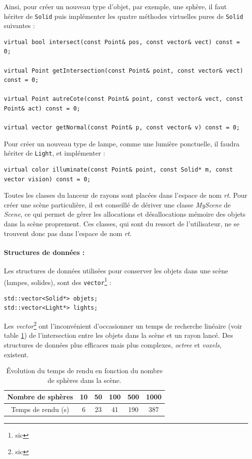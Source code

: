 Ainsi, pour créer un nouveau type d'objet, par exemple, une sphère, il faut hériter de \verb|Solid| puis implémenter les quatre méthodes virtuelles 
pures de \verb|Solid| suivantes :

\begin{lstlisting}
virtual bool intersect(const Point& pos, const vector& vect) const = 0;

virtual Point getIntersection(const Point& point, const vector& vect) const = 0;

virtual Point autreCote(const Point& point, const vector& vect,	const Point& act) const = 0;

virtual vector getNormal(const Point& p, const vector& v) const = 0;
\end{lstlisting}

Pour créer un nouveau type de lampe, comme une lumière ponctuelle, il faudra hériter de \verb|Light|, et implémenter :
\begin{lstlisting}
virtual color illuminate(const Point& point, const Solid* m, const vector vision) const = 0;
\end{lstlisting}

Toutes les classes du lanceur de rayons sont placées dans l'espace de nom \emph{rt}. Pour créer une scène particulière, il est
conseillé de dériver une classe \emph{MyScene}  de \emph{Scene}, ce qui permet de gérer les allocations et désallocations 
mémoire des objets dans la scène proprement. Ces classes, qui sont du ressort de l'utilisateur, ne se trouvent donc pas dans l'espace
 de nom \emph{rt}.

\paragraph{Structures de données : }
Les structures de données utilisées pour conserver les objets dans une scène (lampes, solides), sont des \verb|vector|\footnote{sic} : 
\begin{lstlisting}
std::vector<Solid*> objets;
std::vector<Light*> lights;
\end{lstlisting}
Les \emph{vector}\footnote{sic} ont l'inconvénient d'occasionner un temps de recherche linéaire (voir table \ref{tempsSphères}) de l'intersection entre les objets dans la scène et un rayon lancé. 
Des structures de données plus efficaces mais plus complexes, \emph{octree} et \emph{voxels}, existent.

\begin{table}
\begin{center}
\begin{tabular}{|c|c|c|c|c|c|}
\hline 
Nombre de sphères & 10 & 50 & 100 & 500 & 1000 \\ 
\hline 
Temps de rendu (s) & 6 & 23 & 41 & 190 & 387 \\ 
\hline 
\end{tabular} 
\end{center}
\caption{Évolution du temps de rendu en fonction du nombre de sphères dans la scène.} \label{tempsSphères}
\end{table}